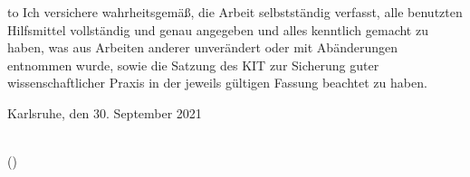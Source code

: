 
\thispagestyle{empty}
\null\vfill
\noindent\hbox to \textwidth{\hrulefill} 
%
{Ich versichere wahrheitsgemäß, die Arbeit selbstständig verfasst, alle benutzten Hilfsmittel
vollständig und genau angegeben und alles kenntlich gemacht zu haben, was aus
Arbeiten anderer unverändert oder mit Abänderungen entnommen wurde, sowie die
Satzung des KIT zur Sicherung guter wissenschaftlicher Praxis in der jeweils gültigen
Fassung beachtet zu haben.}
 
 

\vspace{1.5cm}
Karlsruhe, den 30. September 2021
\vspace{1.5cm}
 
\dotfill\hspace*{9.45cm}\\
\hspace*{1.9cm}(\theauthor) 
\cleardoublepage